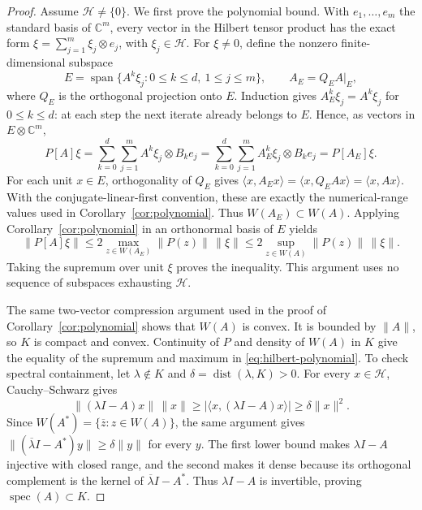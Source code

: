 \documentclass[11pt]{article}
\newcommand{\C}{\mathbb C}
\DeclareMathOperator{\dist}{dist}
\DeclareMathOperator{\spec}{spec}
\theoremstyle{definition}
\theoremstyle{remark}
\numberwithin{equation}{section}
\begin{document}
\begin{proof}
Assume $\mathcal H\ne\{0\}$. We first prove the polynomial bound. With
$e_1,\ldots,e_m$ the standard basis of $\C^m$, every vector in the Hilbert
tensor product has the exact form
$\xi=\sum_{j=1}^m\xi_j\otimes e_j$, with $\xi_j\in\mathcal H$.
For $\xi\ne0$, define the nonzero finite-dimensional subspace
\[
 E=\operatorname{span}\{A^k\xi_j:0\le k\le d,\ 1\le j\le m\},
 \qquad A_E=Q_EA|_E,
\]
where $Q_E$ is the orthogonal projection onto $E$. Induction gives
$A_E^k\xi_j=A^k\xi_j$ for $0\le k\le d$: at each step the next iterate
already belongs to $E$. Hence, as vectors in $E\otimes\C^m$,
\[
 P[A]\xi=\sum_{k=0}^d\sum_{j=1}^m A^k\xi_j\otimes B_ke_j
         =\sum_{k=0}^d\sum_{j=1}^m A_E^k\xi_j\otimes B_ke_j
         =P[A_E]\xi.
\]
For each unit $x\in E$, orthogonality of $Q_E$ gives
$\langle x,A_Ex\rangle=\langle x,Q_EAx\rangle=\langle x,Ax\rangle$.
With the conjugate-linear-first convention, these are exactly the
numerical-range values used in Corollary~\ref{cor:polynomial}.
Thus $W(A_E)\subset W(A)$. Applying Corollary~\ref{cor:polynomial} in an
orthonormal basis of $E$ yields
\[
 \|P[A]\xi\|\le2\max_{z\in W(A_E)}\|P(z)\|\,\|\xi\|
              \le2\sup_{z\in W(A)}\|P(z)\|\,\|\xi\|.
\]
Taking the supremum over unit $\xi$ proves the inequality. This argument
uses no sequence of subspaces exhausting $\mathcal H$.

The same two-vector compression argument used in the proof of
Corollary~\ref{cor:polynomial} shows that $W(A)$ is convex. It is bounded by
$\|A\|$, so $K$ is compact and convex. Continuity of $P$ and density of
$W(A)$ in $K$ give the equality of the supremum and maximum in
\eqref{eq:hilbert-polynomial}. To check spectral containment, let
$\lambda\notin K$ and $\delta=\dist(\lambda,K)>0$. For every
$x\in\mathcal H$, Cauchy--Schwarz gives
\[
 \|(\lambda I-A)x\|\,\|x\|
 \ge |\langle x,(\lambda I-A)x\rangle|
 \ge\delta\|x\|^2.
\]
Since $W(A^*)=\{\overline z:z\in W(A)\}$,
the same argument gives
$\|(\overline\lambda I-A^*)y\|\ge\delta\|y\|$ for every $y$.
The first lower bound makes $\lambda I-A$ injective with closed range, and the
second makes it dense because its orthogonal complement is the kernel of
$\overline\lambda I-A^*$. Thus $\lambda I-A$ is invertible, proving
$\spec(A)\subset K$.


\end{proof}
\end{document}
